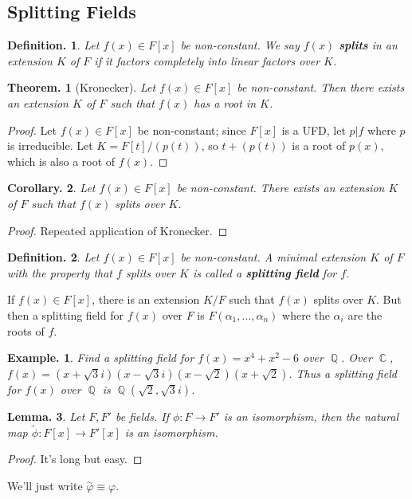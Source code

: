 \documentclass[11pt, a4paper]{memoir}
\DeclareMathOperator{\Q}{{\mathbb{Q}}}
\DeclareMathOperator{\C}{{\mathbb{C}}}
\newcommand{\mbf}[1]{{\boldmath\bfseries #1}}
\theoremstyle{change}
\newtheorem{theorem}{Theorem.}[section]
\newtheorem{lemma}[theorem]{Lemma.}
\newtheorem{corollary}[theorem]{Corollary.}
\theoremstyle{plain}
\theoremstyle{nonumberplain}
\newtheorem{definition}{Definition.}
\newtheorem{example}{Example.}
\newtheorem{proof}{Proof}
\numberwithin{equation}{section}
\begin{document}
\subsection{Splitting Fields}
\begin{definition}
    Let $f(x)\in F[x]$ be non-constant.
    We say $f(x)$ \mbf{splits} in an extension $K$ of $F$ if it factors completely into linear factors over $K$.
\end{definition}
\begin{theorem}[Kronecker]
    Let $f(x)\in F[x]$ be non-constant.
    Then there exists an extension $K$ of $F$ such that $f(x)$ has a root in $K$.
\end{theorem}
\begin{proof}
    Let $f(x)\in F[x]$ be non-constant; since $F[x]$ is a UFD, let $p|f$ where $p$ is irreducible.
    Let $K=F[t]/(p(t))$, so $t+(p(t))$ is a root of $p(x)$, which is also a root of $f(x)$.
\end{proof}
\begin{corollary}
    Let $f(x)\in F[x]$ be non-constant.
    There exists an extension $K$ of $F$ such that $f(x)$ splits over $K$.
\end{corollary}
\begin{proof}
    Repeated application of Kronecker.
\end{proof}
\begin{definition}
    Let $f(x)\in F[x]$ be non-constant.
    A minimal extension $K$ of $F$ with the property that $f$ splits over $K$ is called a \mbf{splitting field} for $f$.
\end{definition}
If $f(x)\in F[x]$, there is an extension $K/F$ such that $f(x)$ splits over $K$.
But then a splitting field for $f(x)$ over $F$ is $F(\alpha_1,\ldots,\alpha_n)$ where the $\alpha_i$ are the roots of $f$.
\begin{example}
    Find a splitting field for $f(x)=x^4+x^2-6$ over $\Q$.
    Over $\C$, $f(x)=(x+\sqrt{3}i)(x-\sqrt{3}i)(x-\sqrt{2})(x+\sqrt{2})$.
    Thus a splitting field for $f(x)$ over $\Q$ is $\Q(\sqrt{2},\sqrt{3}i)$.
\end{example}
\begin{lemma}
    Let $F,F'$ be fields.
    If $\phi:F\to F'$ is an isomorphism, then the natural map $\tilde\phi:F[x]\to F'[x]$ is an isomorphism.
\end{lemma}
\begin{proof}
    It's long but easy.
\end{proof}
We'll just write $\overset{\sim}{\varphi}\equiv\varphi$.
\end{document}
